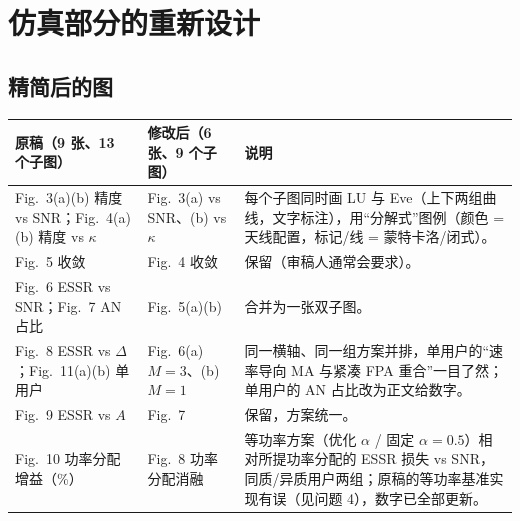\documentclass[11pt,a4paper]{ctexart}
\begin{document}
\section{仿真部分的重新设计}
\subsection{精简后的图}
\begin{longtable}{p{4.2cm}p{4.3cm}p{7.0cm}}
\toprule
原稿（9 张、13 个子图） & 修改后（6 张、9 个子图） & 说明 \\ \midrule
Fig.~3(a)(b) 精度 vs SNR；Fig.~4(a)(b) 精度 vs $\kappa$ & Fig.~3(a) vs SNR、(b) vs $\kappa$ & 每个子图同时画 LU 与 Eve（上下两组曲线，文字标注），用“分解式”图例（颜色 = 天线配置，标记/线 = 蒙特卡洛/闭式）。\\
Fig.~5 收敛 & Fig.~4 收敛 & 保留（审稿人通常会要求）。\\
Fig.~6 ESSR vs SNR；Fig.~7 AN 占比 & Fig.~5(a)(b) & 合并为一张双子图。\\
Fig.~8 ESSR vs $\Delta$；Fig.~11(a)(b) 单用户 & Fig.~6(a) $M=3$、(b) $M=1$ & 同一横轴、同一组方案并排，单用户的“速率导向 MA 与紧凑 FPA 重合”一目了然；单用户的 AN 占比改为正文给数字。\\
Fig.~9 ESSR vs $A$ & Fig.~7 & 保留，方案统一。\\
Fig.~10 功率分配增益（\%） & Fig.~8 功率分配消融 & 等功率方案（优化 $\alpha$ / 固定 $\alpha=0.5$）相对所提功率分配的 ESSR 损失 vs SNR，同质/异质用户两组；原稿的等功率基准实现有误（见问题 4），数字已全部更新。\\
\bottomrule
\end{longtable}
\end{document}
